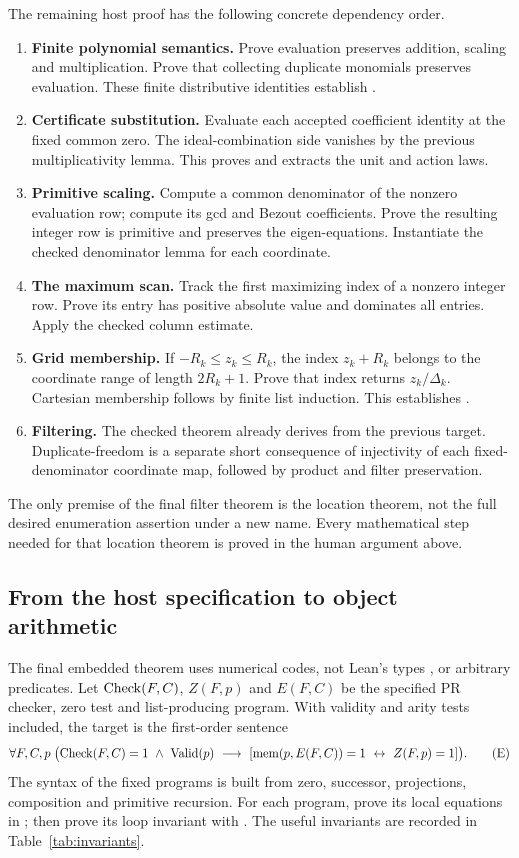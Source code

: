 The remaining host proof has the following concrete dependency order.
\begin{enumerate}
\item \textbf{Finite polynomial semantics.} Prove evaluation preserves
addition, scaling and multiplication. Prove that collecting duplicate
monomials preserves evaluation. These finite distributive identities
establish .
\item \textbf{Certificate substitution.} Evaluate each accepted
coefficient identity at the fixed common zero. The ideal-combination
side vanishes by the previous multiplicativity lemma. This proves
 and extracts the unit and action laws.
\item \textbf{Primitive scaling.} Compute a common denominator of the
nonzero evaluation row; compute its gcd and Bezout coefficients. Prove
the resulting integer row is primitive and preserves the eigen-equations.
Instantiate the checked denominator lemma for each coordinate.
\item \textbf{The maximum scan.} Track the first maximizing index of a
nonzero integer row. Prove its entry has positive absolute value and
dominates all entries. Apply the checked column estimate.
\item \textbf{Grid membership.} If $-R_k\le z_k\le R_k$, the index
$z_k+R_k$ belongs to the coordinate range of length $2R_k+1$.
Prove that index returns $z_k/\Delta_k$. Cartesian membership follows
by finite list induction. This establishes .
\item \textbf{Filtering.} The checked theorem
 already derives
 from the previous target. Duplicate-freedom
is a separate short consequence of injectivity of each fixed-denominator
coordinate map, followed by product and filter preservation.
\end{enumerate}
The only premise of the final filter theorem is the location theorem,
not the full desired enumeration assertion under a new name. Every
mathematical step needed for that location theorem is proved in the
human argument above.

\subsection{From the host specification to object arithmetic}

The final embedded theorem uses numerical codes, not Lean's types
,  or arbitrary predicates. Let
$\operatorname{Check}(F,C)$, $Z(F,p)$ and $E(F,C)$ be the specified PR checker,
zero test and list-producing program. With validity and arity tests
included, the target is the first-order sentence
\[
 \forall F,C,p\;\bigl(\operatorname{Check}(F,C)=1\ \land\ \operatorname{Valid}(p)
 \ \longrightarrow\
 [\operatorname{mem}(p,E(F,C))=1\ \leftrightarrow\ Z(F,p)=1]\bigr).
 \tag{E}\label{eq:object-enumeration}
\]
The syntax of the fixed programs is built from zero, successor,
projections, composition and primitive recursion. For each program,
prove its local equations in \code{Prf PRAAx}; then prove its loop
invariant with \code{PRA.qfInd}. The useful invariants are recorded
in Table~\ref{tab:invariants}.

